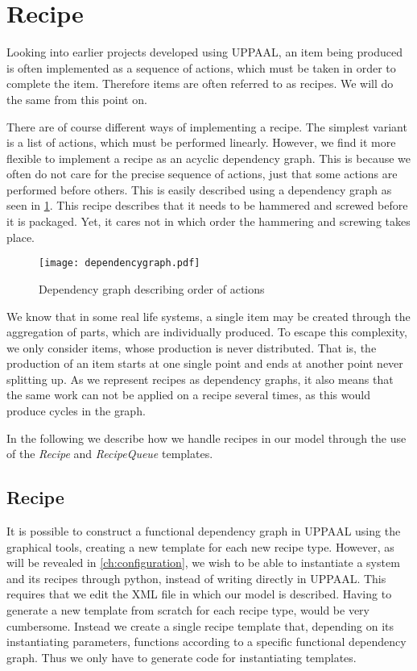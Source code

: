 \section{Recipe}\label{sec:recipe}
Looking into earlier projects developed using UPPAAL, an item being produced is often implemented as a sequence of actions, which must be taken in order to complete the item. Therefore items are often referred to as recipes. We will do the same from this point on. 

There are of course different ways of implementing a recipe. The simplest variant is a list of actions, which must be performed linearly. However, we find it more flexible to implement a recipe as an acyclic dependency graph. This is because we often do not care for the precise sequence of actions, just that some actions are performed before others. This is easily described using a dependency graph as seen in \cref{fig:dependency-graph}. This recipe describes that it needs to be hammered and screwed before it is packaged. Yet, it cares not in which order the hammering and screwing takes place. 

\begin{figure}[h]
\centering
\texttt{[image: dependencygraph.pdf]}
\caption{Dependency graph describing order of actions}
\label{fig:dependency-graph}
\end{figure}

We know that in some real life systems, a single item may be created through the aggregation of parts, which are individually produced. To escape this complexity, we only consider items, whose production is never distributed. That is, the production of an item starts at one single point and ends at another point never splitting up. As we represent recipes as dependency graphs, it also means that the same work can not be applied on a recipe several times, as this would produce cycles in the graph. 

In the following we describe how we handle recipes in our model through the use of the \emph{Recipe} and \emph{RecipeQueue} templates.


\subsection{Recipe}\label{subs:recipe}
It is possible to construct a functional dependency graph in UPPAAL using the graphical tools,  creating a new template for each new recipe type. However, as will be revealed in \cref{ch:configuration}, we wish to be able to instantiate a system and its recipes through python, instead of writing directly in UPPAAL. This requires that we edit the XML file in which our model is described. Having to generate a new template from scratch for each recipe type, would be very cumbersome. Instead we create a single recipe template that, depending on its instantiating parameters, functions according to a specific functional dependency graph. Thus we only have to generate code for instantiating templates.

